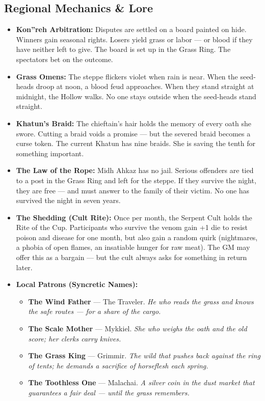 {{\subsection*{Regional Mechanics \& Lore}
\begin{itemize}
\item \textbf{Kon''reh Arbitration:} Disputes are settled on a board painted on hide. Winners gain seasonal rights. Losers yield grass or labor --- or blood if they have neither left to give. The board is set up in the Grass Ring. The spectators bet on the outcome.
\item \textbf{Grass Omens:} The steppe flickers violet when rain is near. When the seed-heads droop at noon, a blood feud approaches. When they stand straight at midnight, the Hollow walks. No one stays outside when the seed-heads stand straight.
\item \textbf{Khatun's Braid:} The chieftain's hair holds the memory of every oath she swore. Cutting a braid voids a promise --- but the severed braid becomes a curse token. The current Khatun has nine braids. She is saving the tenth for something important.
\item \textbf{The Law of the Rope:} Midh Ahkaz has no jail. Serious offenders are tied to a post in the Grass Ring and left for the steppe. If they survive the night, they are free --- and must answer to the family of their victim. No one has survived the night in seven years.
\item \textbf{The Shedding (Cult Rite):} Once per month, the Serpent Cult holds the Rite of the Cup. Participants who survive the venom gain +1 die to resist poison and disease for one month, but also gain a random quirk (nightmares, a phobia of open flames, an insatiable hunger for raw meat). The GM may offer this as a bargain --- but the cult always asks for something in return later.
\item \textbf{Local Patrons (Syncretic Names):}
  \begin{itemize}
    \item \textbf{The Wind Father} --- The Traveler. \textit{He who reads the grass and knows the safe routes --- for a share of the cargo.}
    \item \textbf{The Scale Mother} --- Mykkiel. \textit{She who weighs the oath and the old score; her clerks carry knives.}
    \item \textbf{The Grass King} --- Grimmir. \textit{The wild that pushes back against the ring of tents; he demands a sacrifice of horseflesh each spring.}
    \item \textbf{The Toothless One} --- Malachai. \textit{A silver coin in the dust market that guarantees a fair deal --- until the grass remembers.}

\end{itemize}
\end{itemize}}}
